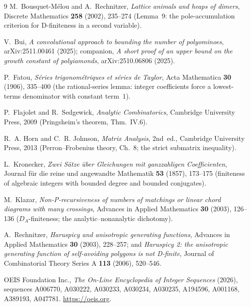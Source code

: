\documentclass[11pt]{article}
\begin{document}
\begin{thebibliography}{9}
M.~Bousquet-M\'elou and A.~Rechnitzer,
\emph{Lattice animals and heaps of dimers},
Discrete Mathematics \textbf{258} (2002), 235--274 (Lemma~9: the
pole-accumulation criterion for D-finiteness in a second variable).

V.~Bui,
\emph{A convolutional approach to bounding the number of polyominoes},
arXiv:2511.00461 (2025); companion, \emph{A short proof of an upper bound on the
growth constant of polyiamonds}, arXiv:2510.06806 (2025).

P.~Fatou,
\emph{S\'eries trigonom\'etriques et s\'eries de Taylor},
Acta Mathematica \textbf{30} (1906), 335--400 (the rational-series lemma:
integer coefficients force a lowest-terms denominator with constant
term~$1$).

P.~Flajolet and R.~Sedgewick,
\emph{Analytic Combinatorics},
Cambridge University Press, 2009 (Pringsheim's theorem, Thm.~IV.6).

R.~A. Horn and C.~R. Johnson,
\emph{Matrix Analysis}, 2nd~ed.,
Cambridge University Press, 2013 (Perron--Frobenius theory, Ch.~8; the
strict submatrix inequality).

L.~Kronecker,
\emph{Zwei S\"atze \"uber Gleichungen mit ganzzahligen Coefficienten},
Journal f\"ur die reine und angewandte Mathematik \textbf{53} (1857),
173--175 (finiteness of algebraic integers with bounded degree and
bounded conjugates).

M.~Klazar,
\emph{Non-P-recursiveness of numbers of matchings or linear chord diagrams
with many crossings},
Advances in Applied Mathematics \textbf{30} (2003), 126--136
($D_A$-finiteness; the analytic--nonanalytic dichotomy).

A.~Rechnitzer,
\emph{Haruspicy and anisotropic generating functions},
Advances in Applied Mathematics \textbf{30} (2003), 228--257; and
\emph{Haruspicy 2: the anisotropic generating function of self-avoiding
polygons is not D-finite},
Journal of Combinatorial Theory Series A \textbf{113} (2006), 520--546.

OEIS Foundation Inc.,
\emph{The On-Line Encyclopedia of Integer Sequences} (2026),
sequences A006770, A030222, A030233, A030234, A030235, A194596, A001168,
A389193, A047781.
\url{https://oeis.org}.

\end{thebibliography}
\end{document}
